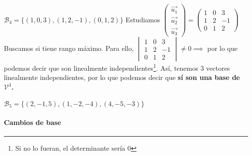 \begin{problem}
        
        \spart $\mathcal{B}_4 = \{(1,0,3),(1,2,-1),(0,1,2)\}$
        \subitem Estudiamos $\displaystyle \begin{pmatrix}\vec{u_1}\\\vec{u_2}\\\vec{u_3}\end{pmatrix} = \begin{pmatrix}1&0&3\\1&2&-1\\0&1&2\end{pmatrix}$ 
        Buscamos si tiene rango máximo. Para ello, $\begin{vmatrix}1&0&3\\1&2&-1\\0&1&2\end{vmatrix} \neq 0 \implies $ por lo que podemos decir que son linealmente independientes\footnote{Si no lo fueran, el determinante sería 0}. Así, tenemos 3 vectores linealmente independientes, por lo que podemos decir que \textbf{sí son una base de $\mathcal{V}^3$.}
        
        
        \spart $\mathcal{B}_5 = \{(2,-1,5),(1,-2,-4),(4,-5,-3)\}$
        \subitem {}
    
\end{problem}

\paragraph{Cambios de base}

